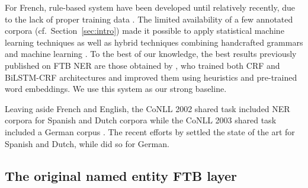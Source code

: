 For French, rule-based system have been developed until relatively recently, due to the lack of proper training data \cite{sekine-nobata-2004-definition,rosset-etal-2005-interaction,stern-sagot-2010-resources,nouvel-etal-2014-pattern}. The limited availability of a few annotated corpora (cf.~Section~\ref{sec:intro}) made it possible to apply statistical machine learning techniques \cite{bechet-charton-2010-unsupervised,dupont-tellier-2014-named,dupont-2017-exploration} as well as hybrid techniques combining handcrafted grammars and machine learning \cite{bechet-etal-2011-cooperation}. To the best of our knowledge, the best results previously published on FTB NER are those obtained by , who trained both CRF and BiLSTM-CRF architectures and improved them using heuristics and pre-trained word embeddings. We use this system as our strong baseline.

Leaving aside French and English, the CoNLL 2002 shared task included NER corpora for Spanish and Dutch corpora \cite{tjong-kim-sang-2002-introduction} while the CoNLL 2003 shared task included a German corpus \cite{tjong-kim-sang-de-meulder-2003-introduction}. The recent efforts by  settled the state of the art for Spanish and Dutch, while  did so for German.



\subsection{The original named entity FTB layer}
\label{subsec:originalannotations}



